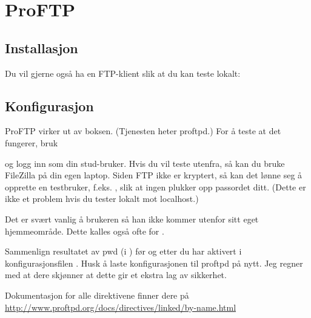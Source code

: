 \chapter{ProFTP} %

\section{Installasjon}


Du vil gjerne også ha en FTP-klient slik at du kan teste lokalt:


\section{Konfigurasjon}

ProFTP virker ut av boksen. (Tjenesten heter proftpd.) 
For å teste at det fungerer, bruk


og logg inn som din stud-bruker. Hvis du vil teste utenfra, så kan du bruke
FileZilla på din egen laptop. Siden FTP ikke er kryptert, så kan det lønne
seg å opprette en testbruker, f.eks. , slik at ingen 
plukker opp passordet ditt. (Dette er ikke et problem hvis du tester lokalt 
mot localhost.)

Det er svært vanlig å  brukeren så han ikke kommer utenfor
sitt eget hjemmeområde. Dette kalles også ofte for . 

Sammenlign resultatet av pwd (i ) før og etter du har aktivert 
 i konfigurasjonsfilen . 
Husk å laste konfigurasjonen til proftpd på nytt. 
Jeg regner med at dere skjønner at dette gir et ekstra lag av sikkerhet.

Dokumentasjon for alle direktivene finner dere på\\
\url{http://www.proftpd.org/docs/directives/linked/by-name.html}
